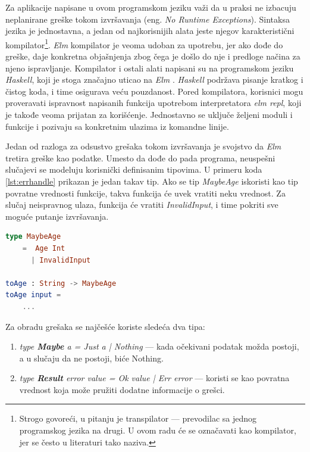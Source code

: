 \documentclass[12pt,oneside]{memoir}
\begin{document}
\par Za aplikacije napisane u ovom programskom jeziku važi da u praksi ne izbacuju neplanirane greške tokom izvršavanja (eng. \emph{No Runtime Exceptions}). Sintaksa jezika je jednostavna, a jedan od najkorisnijih alata jeste njegov karakteristični kompilator\footnote{Strogo govoreći, u pitanju je transpilator --- prevodilac sa jednog programskog jezika na drugi. U ovom radu će se označavati kao kompilator, jer se često u literaturi tako naziva.}. \emph{Elm} kompilator je veoma udoban za upotrebu, jer ako dođe do greške, daje konkretna objašnjenja zbog čega je došlo do nje i predloge načina za njeno ispravljanje. Kompilator i ostali alati napisani su na programskom jeziku \emph{Haskell}, koji je stoga značajno uticao na \emph{Elm} \cite{haskell}. \emph{Haskell} podržava pisanje kratkog i čistog koda, i time osigurava veću pouzdanost. Pored kompilatora, korisnici mogu proveravati ispravnost napisanih funkcija upotrebom interpretatora \emph{elm repl}, koji je takođe veoma prijatan za korišćenje. Jednostavno se uključe željeni moduli i funkcije i pozivaju sa konkretnim ulazima iz komandne linije.
\par Jedan od razloga za odsustvo grešaka tokom izvršavanja je svojstvo da \emph{Elm} tretira greške kao podatke. Umesto da dođe do pada programa, neuspešni slučajevi se modeluju korisnički definisanim tipovima. U primeru koda \ref{lst:errhandle} prikazan je jedan takav tip. Ako se tip \emph{MaybeAge} iskoristi kao tip povratne vrednosti funkcije, takva funkcija će uvek vratiti neku vrednost. Za slučaj neispravnog ulaza, funkcija će vratiti \emph{InvalidInput}, i time pokriti sve moguće putanje izvršavanja. 

\begin{minipage}{\linewidth}
\begin{lstlisting}[language=elm, basicstyle=\small, caption={Primer definicije i upotrebe korisnički definisanog tipa},captionpos=b, label={lst:errhandle}]
type MaybeAge
	=  Age Int
	  | InvalidInput
	  
toAge : String -> MaybeAge
toAge input = 
	... 
\end{lstlisting}
\end{minipage}

\par Za obradu grešaka se najčešće koriste sledeća dva tipa: 

\begin{enumerate}
\item \emph{type \textbf{Maybe} a = Just a | Nothing} --- kada očekivani podatak možda postoji, a u slučaju da ne postoji, biće Nothing.
\item \emph{type \textbf{Result} error value = Ok value | Err error} --- koristi se kao povratna vrednost koja može pružiti dodatne informacije o grešci.
\end{enumerate}
\end{document}
